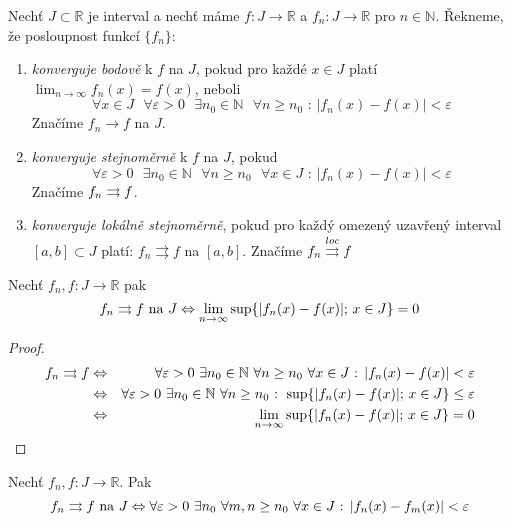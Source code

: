 \begin{definice}
Nechť $J \subset \mathbb{R}$ je interval a nechť máme $f : J \rightarrow \mathbb{R}$ a $f_n : J \rightarrow \mathbb{R}$ pro $n \in \mathbb{N}$. Řekneme, že posloupnost funkcí $\{f_n\}$:

\begin{enumerate}
\item \emph{konverguje bodově} k $f$ na $J$, pokud pro každé $x \in J$ platí $\lim_{n \rightarrow \infty} f_n(x) = f(x)$, neboli
$$\forall x \in J \textrm{ } \forall \varepsilon > 0 \textrm{ } \exists n_0 \in \mathbb{N} \textrm{ } \forall n \geq n_0 \textrm{ : } |f_n(x) - f(x)| < \varepsilon$$
Značíme $f_n \rightarrow f$ na $J$.
\item \emph{konverguje stejnoměrně} k $f$ na $J$, pokud
$$\forall \varepsilon > 0 \textrm{ } \exists n_0 \in \mathbb{N} \textrm{ } \forall n \geq n_0 \textrm{ } \forall x \in J \textrm{ : } | f_n(x) - f(x) | < \varepsilon$$
Značíme $f_n \rightrightarrows f$.
\item \emph{konverguje lokálně stejnoměrně}, pokud pro každý omezený uzavřený interval $[a, b] \subset J$ platí: $f_n \rightrightarrows f$ na $[a, b]$. Značíme $f_n \overset{loc}{\rightrightarrows} f$
\end{enumerate}
\end{definice}

\begin{vetal}
Nechť $f_n, f:J \rightarrow \mathbb{R}$ pak
$$f_n \rightrightarrows f \textrm{ na } J \Leftrightarrow \lim_{n \rightarrow \infty} \sup \{ |f_n(x) - f(x)| \textrm{; } x \in J \} = 0$$
\end{vetal}

\begin{proof}
\begin{eqnarray*}
f_n \rightrightarrows f & \Leftrightarrow & \forall \varepsilon > 0 \  \exists n_0 \in \mathbb{N} \  \forall n \geq n_0 \  \forall x \in J \textrm{ : } |f_n(x) - f(x)| < \varepsilon \\
& \Leftrightarrow & \forall \varepsilon > 0 \  \exists n_0 \in \mathbb{N} \  \forall n \geq n_0 \textrm{ : } \sup \{ |f_n(x) - f(x) | \textrm{; } x \in J \} \leq \varepsilon \\
& \Leftrightarrow & \lim_{n \to \infty} \sup\{|f_n(x)-f(x)| \textrm{; } x \in J\} = 0
\end{eqnarray*}
\end{proof}

\begin{vetat}
Nechť $f_n,f : J \rightarrow \mathbb{R}$. Pak
$$f_n \rightrightarrows f \textrm{ na } J \Leftrightarrow \forall \varepsilon > 0 \  \exists n_0 \  \forall m,n \geq n_0 \  \forall x \in J \textrm{ : } | f_n(x) - f_m(x)| < \varepsilon$$
\end{vetat}

